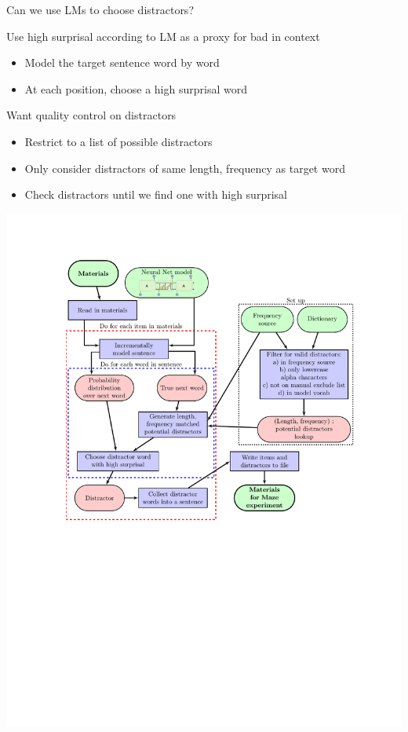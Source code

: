 \documentclass[12pt, xcolor=beamer,table,usenames,dvipsnames, ignorenonframetext, ngerman]{beamer}
\begin{document}
\begin{frame}{Can we use LMs to choose distractors?} 
	
	Use high surprisal according to LM as a proxy for bad in context
	\medskip
	
	\pause
	
	\begin{itemize}
		\item Model the target sentence word by word \pause
		\item At each position, choose a high surprisal word
	\end{itemize}
	\medskip
	\pause
	Want quality control on distractors
	\pause
	\begin{itemize}
		\item Restrict to a list of possible distractors \pause
		\item Only consider distractors of same length, frequency as target word \pause
		\item Check distractors until we find one with high surprisal
	\end{itemize}
	
\end{frame}

\begin{frame}
	\centering
	\includegraphics[clip, trim=3.25cm 5cm 2.5cm 2.5cm,width=.9\textwidth]{../Images/flow_2.pdf}
\end{frame}
\end{document}
